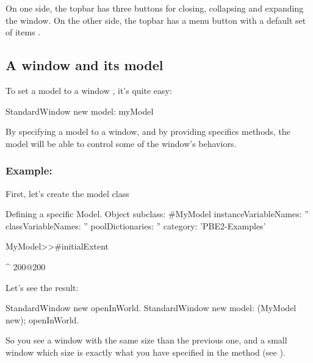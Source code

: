 \documentclass[a4paper,10pt,twoside]{book}
\begin{document}
On one side, the topbar has three buttons for closing, collapsing and expanding the window. On the other side, the topbar has a menu button with a default set of items .

\subsection{A window and its model}

To set a model to a window , it's quite easy:

\begin{code}{}
StandardWindow new model: myModel
\end{code}

By specifying a model to a window, and by providing specifics methods, the model will be able to control some of the window's behaviors.

\subsubsection{Example:}

First, let's create the model class

\begin{classdef}{Defining a specific Model.}
Object subclass: #MyModel
	instanceVariableNames: ''
	classVariableNames: ''
	poolDictionaries: ''
	category: 'PBE2-Examples'

MyModel>>#initialExtent

	^ 200@200
\end{classdef}

Let's see the result:

\begin{code}{}
StandardWindow new openInWorld.
StandardWindow new model: (MyModel new); openInWorld.
\end{code}

So you see a window with the same size than the previous one, and a small window which size is exactly what you have specified in the method  (see ).
\end{document}
